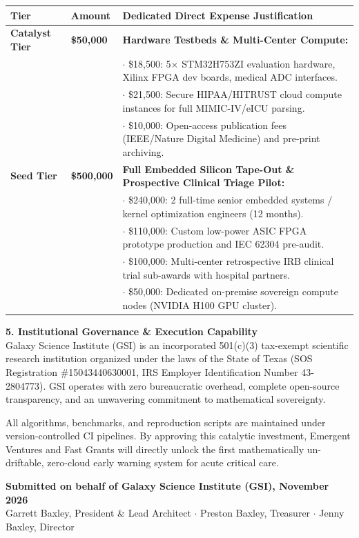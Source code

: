 \documentclass[11pt,letterpaper]{article}
\begin{document}
\begin{center}
\small
\begin{tabularx}{\textwidth}{llX}
\toprule
\textbf{Tier} & \textbf{Amount} & \textbf{Dedicated Direct Expense Justification} \\
\midrule
\textbf{Catalyst Tier} & \textbf{\$50,000} & \textbf{Hardware Testbeds \& Multi-Center Compute:} \\
& & $\cdot$ \$18,500: 5$\times$ STM32H753ZI evaluation hardware, Xilinx FPGA dev boards, medical ADC interfaces.\\
& & $\cdot$ \$21,500: Secure HIPAA/HITRUST cloud compute instances for full MIMIC-IV/eICU parsing.\\
& & $\cdot$ \$10,000: Open-access publication fees (IEEE/Nature Digital Medicine) and pre-print archiving.\\
\midrule
\textbf{Seed Tier} & \textbf{\$500,000} & \textbf{Full Embedded Silicon Tape-Out \& Prospective Clinical Triage Pilot:} \\
& & $\cdot$ \$240,000: 2 full-time senior embedded systems / kernel optimization engineers (12 months).\\
& & $\cdot$ \$110,000: Custom low-power ASIC FPGA prototype production and IEC 62304 pre-audit.\\
& & $\cdot$ \$100,000: Multi-center retrospective IRB clinical trial sub-awards with hospital partners.\\
& & $\cdot$ \$50,000: Dedicated on-premise sovereign compute nodes (NVIDIA H100 GPU cluster). \\
\bottomrule
\end{tabularx}
\end{center}

\vspace{4pt}
\noindent\textbf{5. Institutional Governance \& Execution Capability}\\
Galaxy Science Institute (GSI) is an incorporated 501(c)(3) tax-exempt scientific research institution organized under the laws of the State of Texas (SOS Registration \#15043440630001, IRS Employer Identification Number 43-2804773). GSI operates with zero bureaucratic overhead, complete open-source transparency, and an unwavering commitment to mathematical sovereignty. 

All algorithms, benchmarks, and reproduction scripts are maintained under version-controlled CI pipelines. By approving this catalytic investment, Emergent Ventures and Fast Grants will directly unlock the first mathematically un-driftable, zero-cloud early warning system for acute critical care.

\vspace{6pt}
\noindent\textbf{Submitted on behalf of Galaxy Science Institute (GSI), November 2026}\\[2pt]
Garrett Baxley, President \& Lead Architect $\cdot$ Preston Baxley, Treasurer $\cdot$ Jenny Baxley, Director
\end{document}
